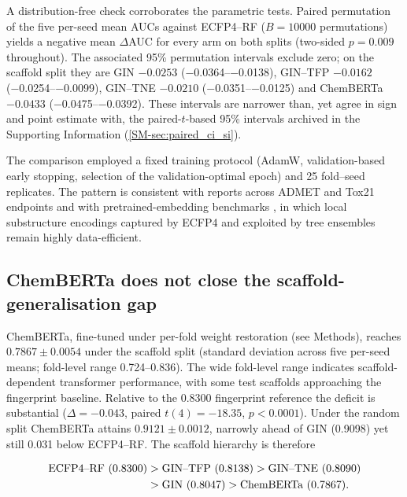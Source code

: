 \documentclass[11pt,a4paper]{article}
\begin{document}
A distribution-free check corroborates the parametric tests. Paired permutation of the five per-seed mean AUCs against ECFP4--RF ($B=\num{10000}$ permutations) yields a negative mean $\Delta$AUC for every arm on both splits (two-sided $p=\num{0.009}$ throughout). The associated 95\% permutation intervals exclude zero; on the scaffold split they are GIN $-\num{0.0253}$ (\numrange{-0.0364}{-0.0138}), GIN--TFP $-\num{0.0162}$ (\numrange{-0.0254}{-0.0099}), GIN--TNE $-\num{0.0210}$ (\numrange{-0.0351}{-0.0125}) and ChemBERTa $-\num{0.0433}$ (\numrange{-0.0475}{-0.0392}). These intervals are narrower than, yet agree in sign and point estimate with, the paired-$t$-based 95\% intervals archived in the Supporting Information (\cref{SM-sec:paired_ci_si}).

The comparison employed a fixed training protocol (AdamW, validation-based early stopping, selection of the validation-optimal epoch) and \num{25} fold--seed replicates. The pattern is consistent with reports across ADMET and Tox21 endpoints \citep{guo_ding_2026} and with pretrained-embedding benchmarks \citep{benchmark_pretrained_2025}, in which local substructure encodings captured by ECFP4 and exploited by tree ensembles remain highly data-efficient.

\subsection{ChemBERTa does not close the scaffold-generalisation gap}

ChemBERTa, fine-tuned under per-fold weight restoration (see Methods), reaches $\num{0.7867} \pm \num{0.0054}$ under the scaffold split (standard deviation across five per-seed means; fold-level range \numrange{0.724}{0.836}). The wide fold-level range indicates scaffold-dependent transformer performance, with some test scaffolds approaching the fingerprint baseline. Relative to the \num{0.8300} fingerprint reference the deficit is substantial ($\Delta = -\num{0.043}$, paired $t(4) = \num{-18.35}$, $p < \num{0.0001}$). Under the random split ChemBERTa attains $\num{0.9121} \pm \num{0.0012}$, narrowly ahead of GIN (\num{0.9098}) yet still \num{0.031} below ECFP4--RF. The scaffold hierarchy is therefore

\begin{equation}
\begin{aligned}
\text{ECFP4--RF (\num{0.8300})} &> \text{GIN--TFP (\num{0.8138})} > \text{GIN--TNE (\num{0.8090})} \\
&> \text{GIN (\num{0.8047})} > \text{ChemBERTa (\num{0.7867})}.
\end{aligned}
\label{eq:hierarchy}
\end{equation}
\end{document}
